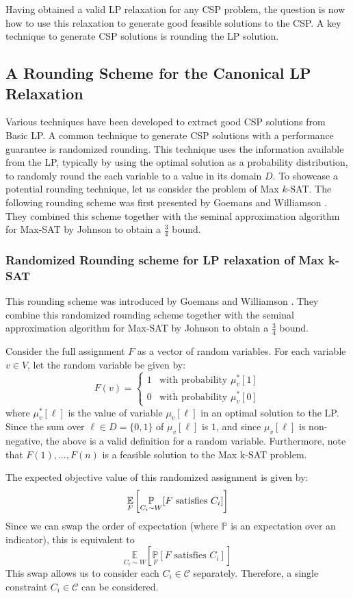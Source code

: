 Having obtained a valid LP relaxation for any CSP problem, the question is now how to use this relaxation to generate good feasible solutions to the CSP. 
A key technique to generate CSP solutions is rounding the LP solution.

\subsection{A Rounding Scheme for the Canonical LP Relaxation}
Various techniques have been developed to extract good CSP solutions from Basic LP.
A common technique to generate CSP solutions with a performance guarantee is randomized rounding.
This technique uses the information available from the LP, typically by using the optimal solution as a probability distribution, to randomly round the each variable to a value in its domain $D$.
To showcase a potential rounding technique, let us consider the problem of Max $k$-SAT. The following rounding scheme was first presented by Goemans and Williamson \cite{GoeWil94}. They combined this scheme together with the seminal approximation algorithm for Max-SAT by Johnson \cite{Joh73} to obtain a $\frac{3}{4}$ bound.

\subsubsection{Randomized Rounding scheme for LP relaxation of Max k-SAT}\label{sec:lpRoundingSat}
This rounding scheme was introduced by Goemans and Williamson \cite{GoeWil94}. They combine this randomized rounding scheme together with the seminal approximation algorithm for Max-SAT by Johnson \cite{Joh73} to obtain a $\frac{3}{4}$ bound.
 
Consider the full assignment $F$ as a vector of random variables. For each variable $v \in V$, let the random variable be given by:
\[
	F(v) = \begin{cases}
	1 & \text{with probability } \mu^*_v[1]\\
	0 & \text{with probability } \mu^*_v[0]
	\end{cases}
\]
where $\mu^*_v[\ell]$ is the value of variable $\mu_v[\ell]$ in an optimal solution to the LP.
Since the sum over $\ell \in D = \{0,1\}$ of  $\mu_v[\ell]$ is $1$, and since $\mu_v[\ell]$ is non-negative, the above is a valid definition for a random variable. 
Furthermore, note that $F(1), \dots, F(n)$ is a feasible solution to the Max k-SAT problem.

The expected objective value of this randomized assignment is given by:
\[
	\underset{F}{\mathbb{E}}\left[ \underset{C_i \sim W}{\mathbb{P}}[ F \text{ satisfies } C_i] \right]
\]
Since we can swap the order of expectation (where $\mathbb{P}$ is an expectation over an indicator), this is equivalent to
\[
\underset{C_i \sim W}{\mathbb{E}}\left[ \underset{F}{\mathbb{P}}[ F \text{ satisfies } C_i] \right]
\]
This swap allows us to consider each $C_i \in \mathcal{C}$ separately. 
Therefore, a single constraint $C_i \in \mathcal{C}$ can be considered.

